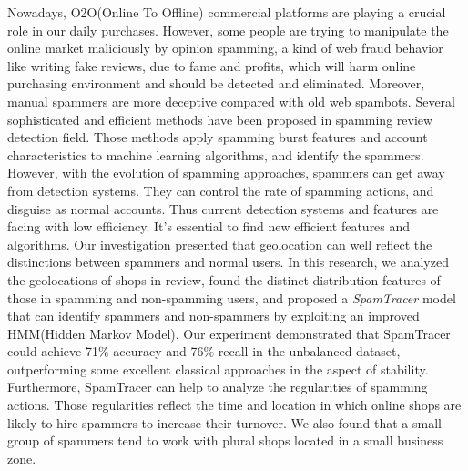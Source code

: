 \begin{englishabstract}

Nowadays, O2O(Online To Offline) commercial platforms are playing a crucial role in our daily purchases. However, some people are trying to manipulate the online market maliciously by opinion spamming, a kind of web fraud behavior like writing fake reviews, due to fame and profits, which will harm online purchasing environment and should be detected and eliminated. Moreover, manual spammers are more deceptive compared with old web spambots. Several sophisticated and efficient methods have been proposed in spamming review detection field. Those methods apply spamming burst features and account characteristics to machine learning algorithms, and identify the spammers. However, with the evolution of spamming approaches, spammers can get away from detection systems. They can control the rate of spamming actions, and disguise as normal accounts. Thus current detection systems and features are facing with low efficiency. It's essential to find new efficient features and algorithms. Our investigation presented that geolocation can well reflect the distinctions between spammers and normal users. In this research, we analyzed the geolocations of shops in review, found the distinct distribution features of those in spamming and non-spamming users, and proposed a \emph{SpamTracer} model that can identify spammers and non-spammers by exploiting an improved HMM(Hidden Markov Model). Our experiment demonstrated that SpamTracer could achieve 71\% accuracy and 76\% recall in the unbalanced dataset, outperforming some excellent classical approaches in the aspect of stability. Furthermore, SpamTracer can help to analyze the regularities of spamming actions. Those regularities reflect the time and location in which online shops are likely to hire spammers to increase their turnover. We also found that a small group of spammers tend to work with plural shops located in a small business zone.

\end{englishabstract}


